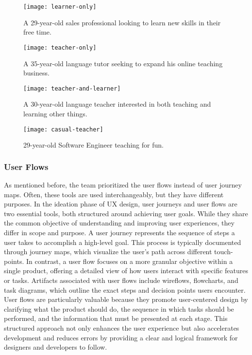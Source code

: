 \begin{figure}[h]
    \centering
    \texttt{[image: learner-only]}
    \caption{A 29-year-old sales professional looking to learn new skills in their free time.}\label{fig:figure}
\end{figure}
\begin{figure}[t]
    \centering
    \texttt{[image: teacher-only]}
    \caption{A 35-year-old language tutor seeking to expand his online teaching business.}\label{fig:figure2}
\end{figure}
\begin{figure}[h]
    \centering
    \texttt{[image: teacher-and-learner]}
    \caption{A 30-year-old language teacher interested in both teaching and learning other things.}\label{fig:figure3}
\end{figure}
\begin{figure}[b]
    \centering
    \texttt{[image: casual-teacher]}
    \caption{ 29-year-old Software Engineer teaching for fun.}\label{fig:figure4}
\end{figure}

\clearpage

\subsubsection{User Flows}\label{subsubsec:user-flows}
As mentioned before, the team prioritized the user flows instead of user journey maps.
Often, these tools are used interchangeably, but they have different purposes.
In the ideation phase of UX design, user journeys and user flows are two essential tools, both structured around achieving user goals.
While they share the common objective of understanding and improving user experiences, they differ in scope and purpose.
A user journey represents the sequence of steps a user takes to accomplish a high-level goal.
This process is typically documented through journey maps, which visualize the user's path across different touch-points.
In contrast, a user flow focuses on a more granular objective within a single product, offering a detailed view of how users interact with specific features or tasks.
Artifacts associated with user flows include wireflows, flowcharts, and task diagrams, which outline the exact steps and decision points users encounter.\newline
User flows are particularly valuable because they promote user-centered design by clarifying what the product should do, the sequence in which tasks should be performed, and the information that must be presented at each stage.
This structured approach not only enhances the user experience but also accelerates development and reduces errors by providing a clear and logical framework for designers and developers to follow.\cite[User Journeys vs User Flows]{userJourneys}

